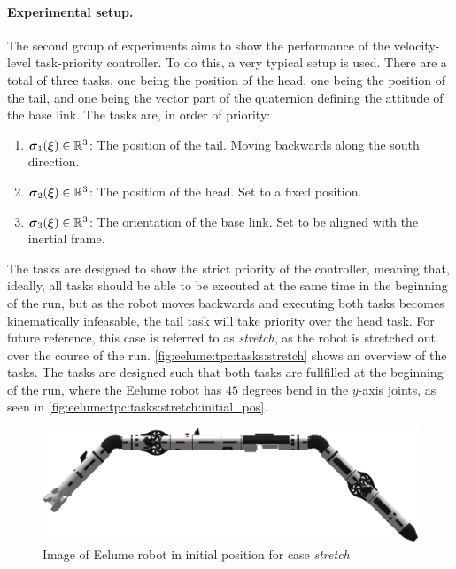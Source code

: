 \paragraph{Experimental setup.}
The second group of experiments aims to show the performance of the velocity-level
task-priority controller. To do this, a very typical setup is used. There are a total
of three tasks, one being the position of the head, one being the position of the tail,
and one being the vector part of the quaternion defining the attitude of the base link.
The tasks are, in order of priority:
\begin{enumerate}
    \item \(\bm{\sigma}_1(\bm{\xi}) \in \mathbb{R}^3\): The position of the tail. Moving backwards along the south direction.
    \item \(\bm{\sigma}_2(\bm{\xi}) \in \mathbb{R}^3\): The position of the head. Set to a fixed position.
    \item \(\bm{\sigma}_3(\bm{\xi}) \in \mathbb{R}^3\): The orientation of the base link. Set to be aligned with the inertial frame.
\end{enumerate}
The tasks are designed to
show the strict priority of the controller, meaning that, ideally, all tasks
should be able to be executed at the same time in the beginning of the run, but
as the robot moves backwards and executing both tasks becomes kinematically infeasable,
the tail task will take priority over the head task. For future reference, this
case is referred to as \textit{stretch}, as the robot is stretched out over
the course of the run. \autoref{fig:eelume:tpc:tasks:stretch} shows an overview of the tasks.
The tasks are designed such that both tasks are fullfilled at the beginning of the run,
where the Eelume robot has \(45\) degrees bend in the \(y\)-axis joints, as
seen in \autoref{fig:eelume:tpc:tasks:stretch:initial_pos}.

\begin{figure}[!ht]
    \centering
    \includegraphics[width=\textwidth]{assets/side-view-45-joints.png}
    \caption{Image of Eelume robot in initial position for case \textit{stretch}}
    \label{fig:eelume:tpc:tasks:stretch:initial_pos}
\end{figure}

